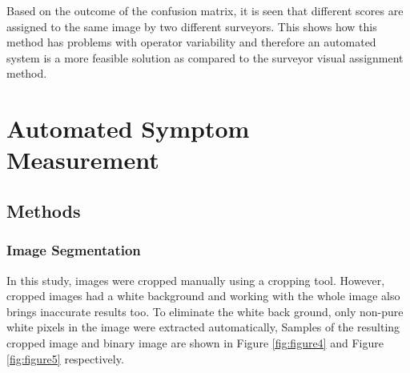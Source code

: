 \documentclass[conference]{IEEEtran}
\begin{document}
Based on the outcome of the confusion matrix, it is seen that different scores are assigned to the same image by two different surveyors. This shows how this method has problems with operator variability and therefore an automated system is a more feasible solution as compared to the surveyor visual assignment method.

\section{Automated Symptom Measurement}
\subsection{Methods}
\subsubsection{Image Segmentation}
In this study, images were cropped manually using a cropping tool. However, cropped images had a white background and working with the whole image also brings inaccurate results too. To eliminate the white back ground, only non-pure white pixels in the image were extracted automatically, Samples of the resulting cropped image and binary image are shown in Figure \ref{fig:figure4} and Figure \ref{fig:figure5} respectively.
\end{document}
